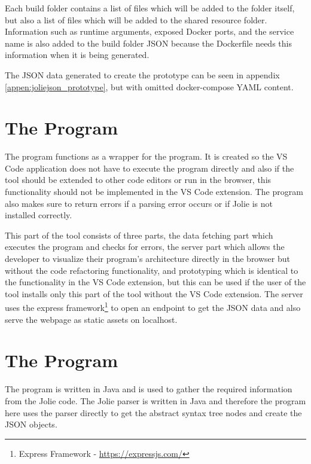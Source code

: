 Each build folder contains a list of files which will be added to the folder itself, but also a list of files which will be added to the shared resource folder.
Information such as runtime arguments, exposed Docker ports, and the service name is also added to the build folder JSON because the Dockerfile needs this information when it is being generated.

The JSON data generated to create the prototype can be seen in appendix \ref*{appen:joliejson_prototype}, but with omitted docker-compose YAML content.

\section{The \nodetoolname[] Program}
The \nodetoolname[] program functions as a wrapper for the \javatoolname[] program. It is created so the VS Code application does not have to execute the \javatoolname[] program directly and also if the tool should be extended to other code editors or run in the browser, this functionality should not be implemented in the VS Code extension.
The \nodetoolname[] program also makes sure to return errors if a parsing error occurs or if Jolie is not installed correctly.

This part of the tool consists of three parts, the data fetching part which executes the \javatoolname[] program and checks for errors, the server part which allows the developer to visualize their program's architecture directly in the browser but without the code refactoring functionality, and
prototyping which is identical to the functionality in the VS Code extension, but this can be used if the user of the tool installs only this part of the tool without the VS Code extension.
The server uses the express framework\footnote{Express Framework - \url{https://expressjs.com/}} to open an endpoint to get the JSON data and also serve the webpage as static assets on localhost.

\section{The \javatoolname[] Program}
The \javatoolname[] program is written in Java and is used to gather the required information from the Jolie code. The Jolie parser is written in Java and therefore the \javatoolname[] program here uses the parser directly to get the abstract syntax tree nodes and create the JSON objects.

